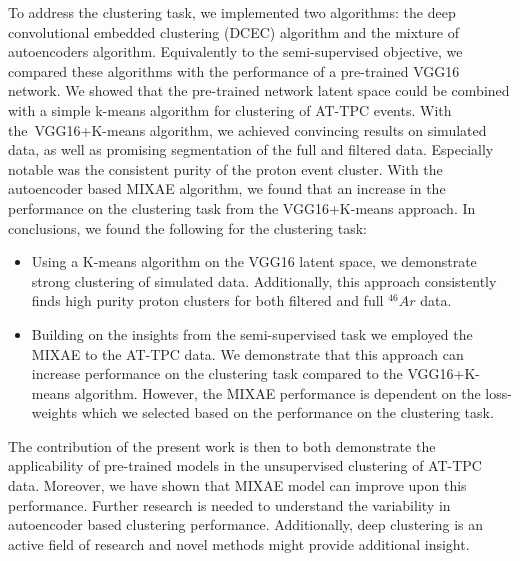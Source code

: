 To address the clustering task, we implemented two algorithms: the deep convolutional embedded clustering (DCEC) algorithm and the mixture of autoencoders algorithm. Equivalently to the semi-supervised objective, we compared these algorithms with the performance of a pre-trained VGG16 network. We showed that the pre-trained network latent space could be combined with a simple k-means algorithm for clustering of AT-TPC events. With the VGG16+K-means algorithm, we achieved convincing results on simulated data, as well as promising segmentation of the full and filtered data. Especially notable was the consistent purity of the proton event cluster. With the autoencoder based MIXAE  algorithm, we found that an increase in the performance on the clustering task from the VGG16+K-means approach.  In conclusions, we found the following for the clustering task:

\begin{itemize}
\item Using a K-means algorithm on the VGG16 latent space, we demonstrate strong clustering of simulated data. Additionally, this approach consistently finds high purity proton clusters for both filtered and full ${}^{46}Ar$ data.
\item Building on the insights from the semi-supervised task we employed the MIXAE to the AT-TPC data. We demonstrate that this approach can increase performance on the clustering task compared to the VGG16+K-means algorithm.  However, the MIXAE performance is dependent on the loss-weights which we selected based on the performance on the clustering task.
\end{itemize}

The contribution of the present work is then to both demonstrate the applicability of pre-trained models in the unsupervised clustering of AT-TPC data. Moreover, we have shown that MIXAE model can improve upon this performance. Further research is needed to understand the variability in autoencoder based clustering performance. Additionally, deep clustering is an active field of research and novel methods might provide additional insight. 